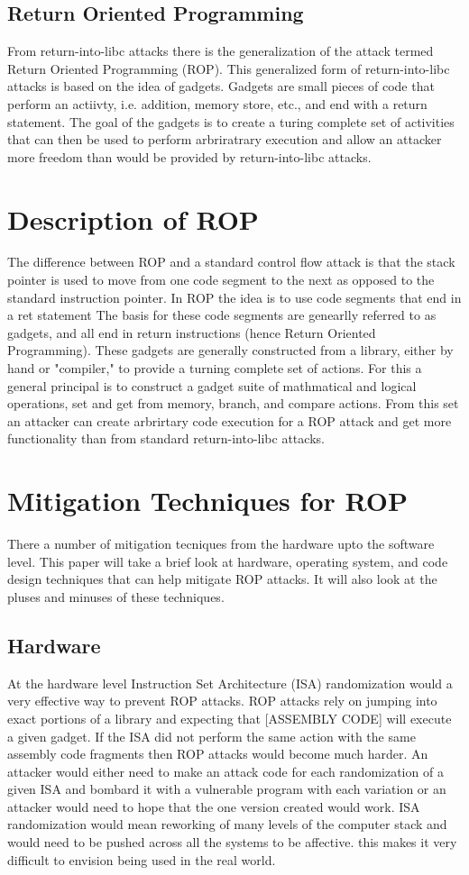 \documentclass[11pt]{amsart}
\begin{document}
\subsection*{Return Oriented Programming}
From return-into-libc attacks there is the generalization of the attack termed Return Oriented Programming (ROP).  This generalized form of return-into-libc attacks is based on the idea of gadgets.  Gadgets are small pieces of code that perform an actiivty, i.e. addition, memory store, etc., and end with a return statement.  The goal of the gadgets is to create a turing complete set of activities that can then be used to perform arbriratrary execution and allow an attacker more freedom than would be provided by return-into-libc attacks.
\section*{Description of ROP}
The difference between ROP and a standard control flow attack is that the stack pointer is used to move from one code segment to the next as opposed to the standard instruction pointer.  In ROP the idea is to use code segments that end in a ret statement
The basis for these code segments are genearlly referred to as gadgets, and all end in return instructions (hence Return Oriented Programming).  These gadgets are generally constructed from a library, either by hand or "compiler," to provide a turning complete set of actions. For this a general principal is to construct a gadget suite of mathmatical and logical operations, set and get from memory, branch, and compare actions.  From this set an attacker can create arbrirtary code execution for a ROP attack and get more functionality than from standard return-into-libc attacks.
\section*{Mitigation Techniques for ROP}
There a number of mitigation tecniques from the hardware upto the software level.  This paper will take a brief look at hardware, operating system, and code design techniques that can help mitigate ROP attacks.  It will also look at the pluses and minuses of these techniques.
\subsection*{Hardware}
At the hardware level Instruction Set Architecture (ISA) randomization would a very effective way to prevent ROP attacks.  ROP attacks rely on jumping into exact portions of a library and expecting that [ASSEMBLY CODE] will execute a given gadget.  If the ISA did not perform the same action with the same assembly code fragments then ROP attacks would become much harder.  An attacker would either need to make an attack code for each randomization of a given ISA and bombard it with a vulnerable program with each variation or an attacker would need to hope that the one version created would work.  ISA randomization would mean reworking of many levels of the computer stack and would need to be pushed across all the systems to be affective. this makes it very difficult to envision being used in the real world.
\end{document}
